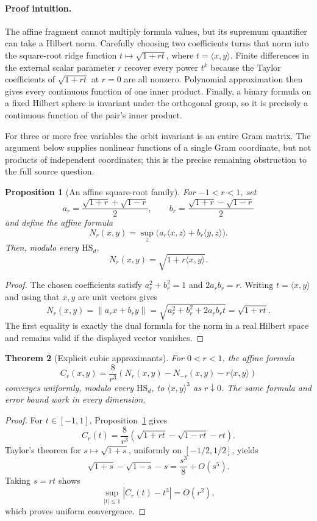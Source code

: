 \documentclass[11pt]{article}
\newtheorem{theorem}{Theorem}
\newtheorem{proposition}[theorem]{Proposition}
\newcommand{\ip}[2]{\langle #1,#2\rangle}
\newcommand{\HS}{\mathrm{HS}}
\begin{document}
\paragraph{Proof intuition.}
The affine fragment cannot multiply formula values, but its supremum
quantifier can take a Hilbert norm.  Carefully choosing two coefficients turns
that norm into the square-root ridge function
$t\mapsto\sqrt{1+rt}$, where $t=\ip{x}{y}$.  Finite differences in the
external scalar parameter $r$ recover every power $t^k$ because the Taylor
coefficients of $\sqrt{1+rt}$ at $r=0$ are all nonzero.  Polynomial
approximation then gives every continuous function of one inner product.
Finally, a binary formula on a fixed Hilbert sphere is invariant under the
orthogonal group, so it is precisely a continuous function of the pair's
inner product.

For three or more free variables the orbit invariant is an entire Gram
matrix.  The argument below supplies nonlinear functions of a single Gram
coordinate, but not products of independent coordinates; this is the precise
remaining obstruction to the full source question.

\begin{proposition}[An affine square-root family]\label{prop:sqrt}
For $-1<r<1$, set
\[
 a_r=\frac{\sqrt{1+r}+\sqrt{1-r}}2,
 \qquad
 b_r=\frac{\sqrt{1+r}-\sqrt{1-r}}2
\]
and define the affine formula
\[
 N_r(x,y)=\sup_z\bigl(a_r\ip{x}{z}+b_r\ip{y}{z}\bigr).
\]
Then, modulo every $\HS_d$,
\[
 N_r(x,y)=\sqrt{1+r\ip{x}{y}}.
\]
\end{proposition}

\begin{proof}
The chosen coefficients satisfy $a_r^2+b_r^2=1$ and $2a_rb_r=r$.
Writing $t=\ip{x}{y}$ and using that $x,y$ are unit vectors gives
\[
 N_r(x,y)=\|a_rx+b_ry\|
 =\sqrt{a_r^2+b_r^2+2a_rb_rt}=\sqrt{1+rt}.
\]
The first equality is exactly the dual formula for the norm in a real Hilbert
space and remains valid if the displayed vector vanishes.
\end{proof}

\begin{theorem}[Explicit cubic approximants]\label{thm:cubic}
For $0<r<1$, the affine formula
\[
 C_r(x,y)=\frac{8}{r^3}
 \left(N_r(x,y)-N_{-r}(x,y)-r\ip{x}{y}\right)
\]
converges uniformly, modulo every $\HS_d$, to $\ip{x}{y}^3$ as
$r\downarrow0$.  The same formula and error bound work in every dimension.
\end{theorem}

\begin{proof}
For $t\in[-1,1]$, Proposition~\ref{prop:sqrt} gives
\[
 C_r(t)=\frac8{r^3}
 \left(\sqrt{1+rt}-\sqrt{1-rt}-rt\right).
\]
Taylor's theorem for $s\mapsto\sqrt{1+s}$, uniformly on
$[-1/2,1/2]$, yields
\[
 \sqrt{1+s}-\sqrt{1-s}-s=\frac{s^3}{8}+O(s^5).
\]
Taking $s=rt$ shows
\[
 \sup_{|t|\leq1}|C_r(t)-t^3|=O(r^2),
\]
which proves uniform convergence.
\end{proof}
\end{document}
